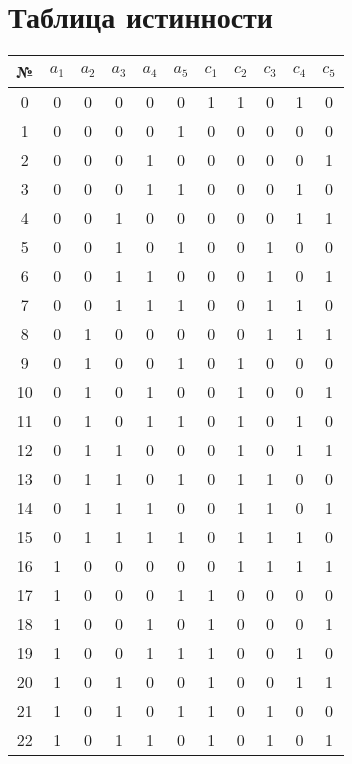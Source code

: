 \documentclass{article}
\begin{document}
\section*{Таблица истинности}
\begin{center}\begin{tabular}{|c|ccccc|ccccc|}
    \hline № & $a_1$ & $a_2$ & $a_3$ & $a_4$ & $a_5$ & $c_1$ & $c_2$ & $c_3$ & $c_4$ & $c_5$ \\ \hline
    0 & 0 & 0 & 0 & 0 & 0 & 1 & 1 & 0 & 1 & 0 \\ \hline
    1 & 0 & 0 & 0 & 0 & 1 & 0 & 0 & 0 & 0 & 0 \\ \hline
    2 & 0 & 0 & 0 & 1 & 0 & 0 & 0 & 0 & 0 & 1 \\ \hline
    3 & 0 & 0 & 0 & 1 & 1 & 0 & 0 & 0 & 1 & 0 \\ \hline
    4 & 0 & 0 & 1 & 0 & 0 & 0 & 0 & 0 & 1 & 1 \\ \hline
    5 & 0 & 0 & 1 & 0 & 1 & 0 & 0 & 1 & 0 & 0 \\ \hline
    6 & 0 & 0 & 1 & 1 & 0 & 0 & 0 & 1 & 0 & 1 \\ \hline
    7 & 0 & 0 & 1 & 1 & 1 & 0 & 0 & 1 & 1 & 0 \\ \hline
    8 & 0 & 1 & 0 & 0 & 0 & 0 & 0 & 1 & 1 & 1 \\ \hline
    9 & 0 & 1 & 0 & 0 & 1 & 0 & 1 & 0 & 0 & 0 \\ \hline
    10 & 0 & 1 & 0 & 1 & 0 & 0 & 1 & 0 & 0 & 1 \\ \hline
    11 & 0 & 1 & 0 & 1 & 1 & 0 & 1 & 0 & 1 & 0 \\ \hline
    12 & 0 & 1 & 1 & 0 & 0 & 0 & 1 & 0 & 1 & 1 \\ \hline
    13 & 0 & 1 & 1 & 0 & 1 & 0 & 1 & 1 & 0 & 0 \\ \hline
    14 & 0 & 1 & 1 & 1 & 0 & 0 & 1 & 1 & 0 & 1 \\ \hline
    15 & 0 & 1 & 1 & 1 & 1 & 0 & 1 & 1 & 1 & 0 \\ \hline
    16 & 1 & 0 & 0 & 0 & 0 & 0 & 1 & 1 & 1 & 1 \\ \hline
    17 & 1 & 0 & 0 & 0 & 1 & 1 & 0 & 0 & 0 & 0 \\ \hline
    18 & 1 & 0 & 0 & 1 & 0 & 1 & 0 & 0 & 0 & 1 \\ \hline
    19 & 1 & 0 & 0 & 1 & 1 & 1 & 0 & 0 & 1 & 0 \\ \hline
    20 & 1 & 0 & 1 & 0 & 0 & 1 & 0 & 0 & 1 & 1 \\ \hline
    21 & 1 & 0 & 1 & 0 & 1 & 1 & 0 & 1 & 0 & 0 \\ \hline
    22 & 1 & 0 & 1 & 1 & 0 & 1 & 0 & 1 & 0 & 1 \\ \hline

\end{tabular}
\end{center}
\end{document}
